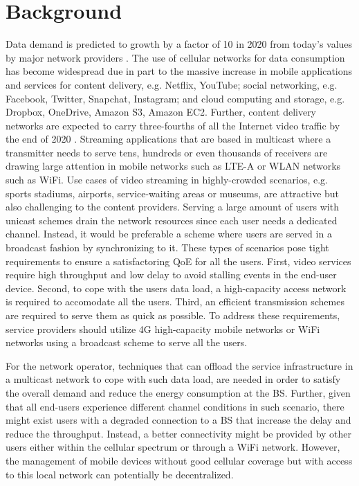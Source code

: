 \section{Background}\label{sec:background}
Data demand is predicted to growth by a factor of 10 in 2020 from today's values by major network providers \cite{cisco2016forecast,kremling2015presentation,belllabs2016report,ericsson2015report}. The use of cellular networks for data consumption has become
widespread due in part to the massive increase in mobile applications and services for content delivery, e.g. Netflix, YouTube; social networking,  e.g. Facebook, Twitter, Snapchat, Instagram; and cloud computing and storage, e.g. Dropbox, OneDrive, Amazon S3, Amazon EC2. Further, content delivery networks are expected to carry three-fourths of all the Internet video traffic by the end of 2020 \cite{cisco2016forecast}. Streaming applications that are based in multicast where a transmitter needs to serve tens, hundreds or even thousands of receivers are drawing large attention in mobile networks such as \ac{LTE-A} or \ac{WLAN} networks such as \ac{WiFi}. Use cases of video streaming in highly-crowded scenarios, e.g. sports stadiums, airports, service-waiting areas or museums, are attractive but also challenging to the content providers. Serving a large amount of users with unicast schemes drain the network resources since each user needs a dedicated channel. Instead, it would be preferable a scheme where users are served in a broadcast fashion by synchronizing to it. These types of scenarios pose tight requirements to ensure a satisfactoring \ac{QoE} for all the users. First, video services require high throughput and low delay to avoid stalling events in the end-user device. Second, to cope with the users data load, a high-capacity access network is required to accomodate all the users. Third, an efficient transmission schemes are required to serve them as quick as possible. To address these requirements, service providers should utilize 4G high-capacity mobile networks or \ac{WiFi} networks using a broadcast scheme to serve all the users.

For the network operator, techniques that can offload the service infrastructure in a multicast network to cope with such data load, are needed in order to satisfy the overall demand and reduce the energy consumption at the \ac{BS}. Further, given that all end-users experience different channel conditions in such scenario, there might exist users with a degraded connection to a \ac{BS} that increase the delay and reduce the throughput. Instead, a better connectivity might be provided by other users either within the cellular spectrum or through a \ac{WiFi} network. However, the management of mobile devices without good cellular coverage but with access to this local network can potentially be decentralized.

